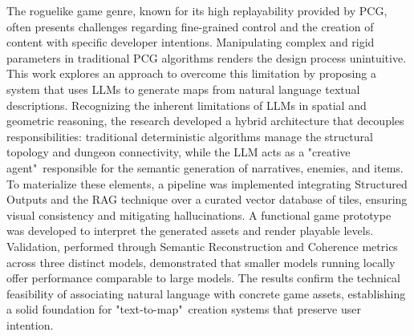 The roguelike game genre, known for its high replayability provided by
\gls{PCG}, often presents challenges regarding fine-grained control and the
creation of content with specific developer intentions. Manipulating complex and
rigid parameters in traditional PCG algorithms renders the design process
unintuitive. This work explores an approach to overcome this limitation by
proposing a system that uses \gls{LLM}s to generate maps from natural language
textual descriptions. Recognizing the inherent limitations of \gls{LLM}s in
spatial and geometric reasoning, the research developed a hybrid architecture
that decouples responsibilities: traditional deterministic algorithms manage the
structural topology and dungeon connectivity, while the \gls{LLM} acts as a
"creative agent"\ responsible for the semantic generation of narratives,
enemies, and items. To materialize these elements, a pipeline was implemented
integrating Structured Outputs and the \gls{RAG} technique over a curated vector
database of tiles, ensuring visual consistency and mitigating hallucinations. A
functional game prototype was developed to interpret the generated assets and
render playable levels. Validation, performed through Semantic Reconstruction
and Coherence metrics across three distinct models, demonstrated that smaller
models running locally offer performance comparable to large models. The results
confirm the technical feasibility of associating natural language with concrete
game assets, establishing a solid foundation for "text-to-map"\ creation systems
that preserve user intention.

